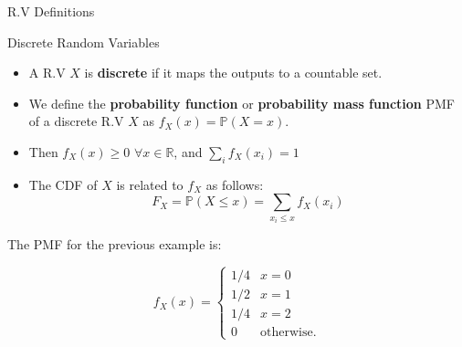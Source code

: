 \documentclass[handout]{beamer}
\begin{document}
\begin{frame}{R.V Definitions}
\scriptsize{

\begin{block}{Discrete Random Variables}
\begin{itemize}
\item A R.V $X$ is \textbf{discrete} if it maps the outputs to a countable set.
\item We define the \textbf{probability function} or \textbf{probability mass function} PMF of a discrete R.V $X$ as $f_{X}(x)=\mathbb{P}(X=x)$.
\item Then $f_{X}(x) \geq 0$  $\forall x \in \mathbb{R}$, and $\sum_{i}f_{X}(x_{i})=1$
\item The CDF of $X$ is related to $f_{X}$ as follows: 
\begin{displaymath}
F_{X}= \mathbb{P}(X\leq x)= \sum_{x_{i} \leq x} f_{X}(x_{i})  
\end{displaymath}
  
\end{itemize}
 
\end{block}
The PMF for the previous example is:

\[   
f_X(x) = 
     \begin{cases}
     1/4 & x=0 \\
     1/2 & x=1 \\
     1/4 & x=2 \\
     0 &  \text{otherwise.}
     \end{cases}
\]


} 
\end{frame}
\end{document}
